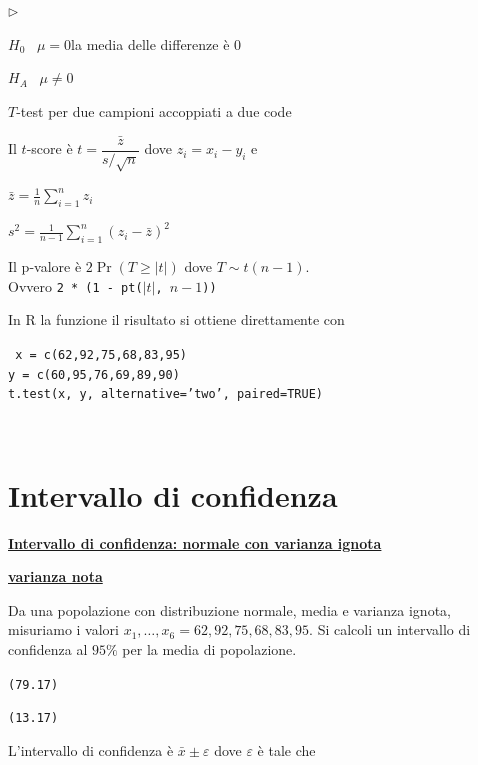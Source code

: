 \documentclass[11pt,openany]{book}
\newcommand{\mylabel}[1]{{\footnotesize\textsf{#1}}\hfill}
\renewenvironment{itemize}
  {\begin{list}{$\triangleright$}{%
   \setlength{\parskip}{0mm}
   \setlength{\topsep}{.2\baselineskip}
   \setlength{\rightmargin}{0mm}
   \setlength{\listparindent}{0mm}
   \setlength{\itemindent}{0mm}
   \setlength{\labelwidth}{3ex}
   \setlength{\itemsep}{.4\baselineskip}
   \setlength{\parsep}{0mm}
   \setlength{\partopsep}{0mm}
   \setlength{\labelsep}{1ex}
   \setlength{\leftmargin}{\labelwidth+\labelsep}
   \let\makelabel\mylabel}}{%
   \end{list}\vspace*{-1.3mm}}
\def\epsilon{\varepsilon}
\begin{document}
\begin{itemize}
\item[1.] $H_0$ \ $\mu = 0$\hfill la media delle differenze è $0$

\item[2.] $H_A$ \ $\mu\neq0$

\item[3.] $T$-test per due campioni accoppiati a due code

\item[3.] Il $t$-score è 
$t = \dfrac{\bar z}{s/\sqrt{n}}$ dove $z_i=x_i-y_i$ e

$\displaystyle\bar z = \frac1{n}\sum^n_{i=1}z_i$

$\displaystyle s^2= \frac1{n-1}\sum^n_{i=1}(z_i-\bar z)^2$

\item[4.] Il p-valore è $2\Pr(T\ge |t|)$ dove $T\sim t(n-1)$.\\ 
Ovvero {\tt 2 * (1 - pt($|t|$, $n-1$))}

\hrulefill\hfill\hfill

In R la funzione il risultato si ottiene direttamente con

{\tt 
x = c(62,92,75,68,83,95)\\
y = c(60,95,76,69,89,90)\\
t.test(x, y, alternative='two', paired=TRUE)}
\end{itemize}



\hfill{}\clearpage\
\section{Intervallo di confidenza}
\label{ICTesempio1}
\hfill\textbf{{\color{brown}\hyperref[IC_varianza_ignota]{Intervallo di confidenza: normale con varianza ignota \faShare}}}


\hfill\textbf{{\color{brown}\hyperref[IC_varianza_nota]{varianza nota \faShare}}}

Da una popolazione con distribuzione normale, media e varianza ignota, misuriamo i valori $x_1,\dots,x_6=62,92,75,68,83,95$. Si calcoli un intervallo di confidenza al $95\%$ per la media di popolazione.

\hfill {\tt (79.17)}

\hfill {\tt (13.17)}

L'intervallo di confidenza è $\bar x\pm\epsilon$ dove $\epsilon$ è tale che 
\end{document}
